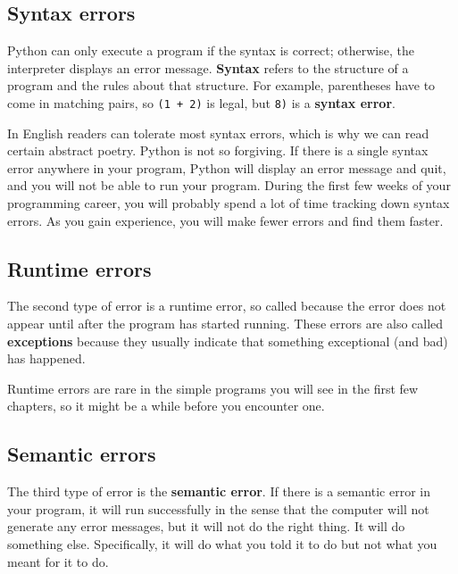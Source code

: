 \documentclass[10pt]{book}
\begin{document}
\subsection{Syntax errors}

Python can only execute a program if the syntax is
correct; otherwise, the interpreter displays an error message.
{\bf Syntax} refers to the structure of a program and the rules about
that structure.  
For example, parentheses have to come in matching pairs, so
{\tt (1 + 2)} is legal, but {\tt 8)} is a {\bf syntax error}.


In English readers can tolerate most syntax errors, which is why we
can read certain abstract poetry.
Python is not so forgiving.  If there is a single syntax error
anywhere in your program, Python will display an error message and quit,
and you will not be able to run your program. During the first few
weeks of your programming career, you will probably spend a lot of
time tracking down syntax errors.  As you gain experience, you will
make fewer errors and find them faster.

\subsection{Runtime errors}
\label{runtime}

The second type of error is a runtime error, so called because the
error does not appear until after the program has started running.
These errors are also called {\bf exceptions} because they usually
indicate that something exceptional (and bad) has happened.

Runtime errors are rare in the simple programs you will see in the
first few chapters, so it might be a while before you encounter one.


\subsection{Semantic errors}

The third type of error is the {\bf semantic error}.  If there is a
semantic error in your program, it will run successfully in the sense
that the computer will not generate any error messages, but it will
not do the right thing.  It will do something else.  Specifically, it
will do what you told it to do but not what you meant for it to do.
\end{document}
